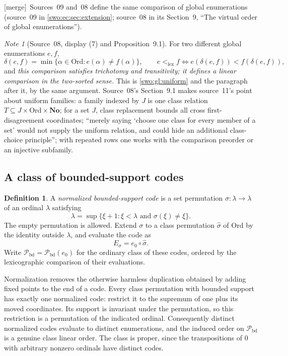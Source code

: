 \documentclass[11pt]{article}
\theoremstyle{definition}
\newtheorem{definition}[definition]{Definition}
\theoremstyle{remark}
\newtheorem{note}[note]{Note}
\newcommand{\No}{\mathbf{No}}
\newcommand{\Ord}{\mathrm{Ord}}
\newcommand{\Pbd}{\mathcal P_{\mathrm{bd}}}
\newcommand{\lex}{\mathrm{lex}}
\newcommand{\merge}{\textsf{[merge]}}
\begin{document}

\merge\ Sources~09 and~08 define the same comparison of global enumerations
(source~09 in \cref{swo:ec:sec:extension}; source~08 in its Section~9, ``The
virtual order of global enumerations'')\label{swo:sk:sec:global}.

\begin{note}[Source~08, display (7) and Proposition~9.1]\label{swo:sk:prop:classlinear}
For two different global enumerations $e,f$,
\[
 \delta(e,f)=\min\{\alpha\in\Ord:e(\alpha)\ne f(\alpha)\},
 \qquad
 e<_{\lex}f\iff e(\delta(e,f))<f(\delta(e,f)),
 \tag{S08.7}\label{swo:sk:eq:t7}
\]
and \emph{this comparison satisfies trichotomy and transitivity; it defines a
linear comparison in the two-sorted sense.} This is \cref{swo:gl:uniform} and
the paragraph after it, by the same argument. Source~08's Section~9.1 makes
source~11's point about uniform families: a family indexed by $J$ is one class
relation $T\subseteq J\times\Ord\times\No$; for a set $J$, class replacement
bounds all cross first-disagreement coordinates; ``merely saying `choose one
class for every member of a set' would not supply the uniform relation, and
could hide an additional class-choice principle''; with repeated rows one
works with the comparison preorder or an injective subfamily.
\end{note}

\subsection{A class of bounded-support codes}

\begin{definition}\label{swo:gl:bounded-codes}
A \emph{normalized bounded-support code} is a set permutation
$\sigma:\lambda\to\lambda$ of an ordinal $\lambda$ satisfying
\[
 \lambda=\sup\{\xi+1:\xi<\lambda\text{ and }\sigma(\xi)\ne\xi\}.
\]
The empty permutation is allowed.  Extend $\sigma$ to a class permutation
$\widehat\sigma$ of $\Ord$ by the identity outside $\lambda$, and evaluate
the code as
\[
 E_\sigma=e_0\circ\widehat\sigma.
\]
Write $\Pbd=\Pbd(e_0)$ for the ordinary class of these codes, ordered by the
lexicographic comparison of their evaluations.
\end{definition}

Normalization removes the otherwise harmless duplication obtained by adding
fixed points to the end of a code.  Every class permutation with bounded
support has exactly one normalized code: restrict it to the supremum of one
plus its moved coordinates.  Its support is invariant under the permutation,
so this restriction is a permutation of the indicated ordinal.  Consequently
distinct normalized codes evaluate to distinct enumerations, and the induced
order on $\Pbd$ is a genuine class linear order.  The class is proper, since
the transpositions of $0$ with arbitrary nonzero ordinals have distinct codes.
\end{document}
